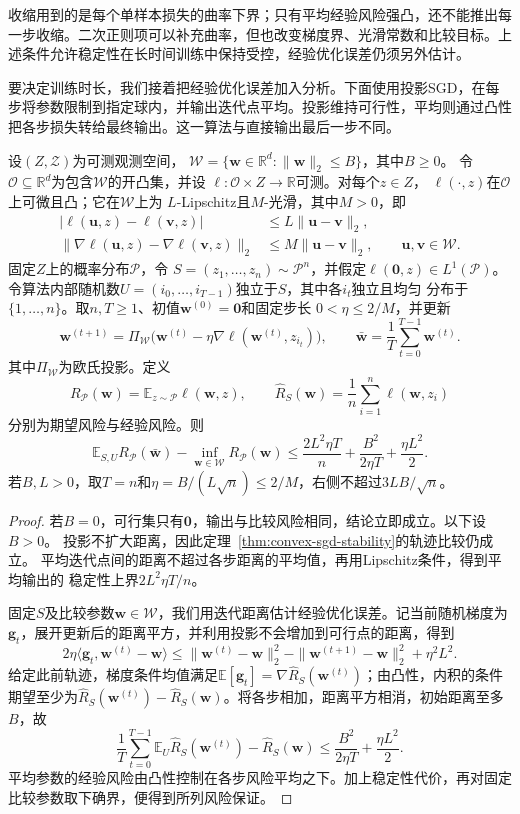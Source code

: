 收缩用到的是每个单样本损失的曲率下界；只有平均经验风险强凸，还不能推出每一步收缩。二次正则项可以补充曲率，但也改变梯度界、光滑常数和比较目标。上述条件允许稳定性在长时间训练中保持受控，经验优化误差仍须另外估计。

要决定训练时长，我们接着把经验优化误差加入分析。下面使用投影SGD，在每步将参数限制到指定球内，并输出迭代点平均。投影维持可行性，平均则通过凸性把各步损失转给最终输出。这一算法与直接输出最后一步不同。

\begin{theorem}[平均投影SGD的期望风险保证]
\label{thm:averaged-sgd-learning}
设$(Z,\mathcal Z)$为可测观测空间，
$\mathcal W=\{\bm w\in\mathbb R^d:\|\bm w\|_2\leq B\}$，其中$B\geq0$。
令$\mathcal O\subseteq\mathbb R^d$为包含$\mathcal W$的开凸集，并设
$\ell:\mathcal O\times Z\to\mathbb R$可测。对每个$z\in Z$，
$\ell(\cdot,z)$在$\mathcal O$上可微且凸；它在$\mathcal W$上为
$L$-Lipschitz且$M$-光滑，其中$M>0$，即
\[
\begin{aligned}
 |\ell(\bm u,z)-\ell(\bm v,z)|
 &\leq L\|\bm u-\bm v\|_2,\\
 \|\nabla\ell(\bm u,z)-\nabla\ell(\bm v,z)\|_2
 &\leq M\|\bm u-\bm v\|_2,
 \qquad \bm u,\bm v\in\mathcal W.
\end{aligned}
\]
固定$Z$上的概率分布$\mathcal P$，令
$S=(z_1,\ldots,z_n)\sim\mathcal P^n$，并假定$\ell(\bm 0,z)\in L^1(\mathcal P)$。
令算法内部随机数$U=(i_0,\ldots,i_{T-1})$独立于$S$，其中各$i_t$独立且均匀
分布于$\{1,\ldots,n\}$。取$n,T\geq1$、初值$\bm w^{(0)}=\bm 0$和固定步长
$0<\eta\leq2/M$，并更新
\[
 \bm w^{(t+1)}=\Pi_{\mathcal W}
   \bigl(\bm w^{(t)}-\eta\nabla\ell(\bm w^{(t)},z_{i_t})\bigr),
 \qquad
 \bar{\bm w}=\frac1T\sum_{t=0}^{T-1}\bm w^{(t)}.
\]
其中$\Pi_{\mathcal W}$为欧氏投影。定义
\[
 R_{\mathcal P}(\bm w)=\mathbb E_{z\sim\mathcal P}\ell(\bm w,z),
 \qquad
 \hat R_S(\bm w)=\frac1n\sum_{i=1}^n\ell(\bm w,z_i)
\]
分别为期望风险与经验风险。则
\[
 \mathbb E_{S,U}R_{\mathcal P}(\bar{\bm w})-\inf_{\bm w\in\mathcal W}R_{\mathcal P}(\bm w)
 \leq\frac{2L^2\eta T}{n}+\frac{B^2}{2\eta T}+\frac{\eta L^2}{2}.
\]
若$B,L>0$，取$T=n$和$\eta=B/(L\sqrt n)\leq2/M$，右侧不超过$3LB/\sqrt n$。
\end{theorem}
\begin{proof}
若$B=0$，可行集只有$\bm0$，输出与比较风险相同，结论立即成立。以下设$B>0$。
投影不扩大距离，因此定理~\ref{thm:convex-sgd-stability}的轨迹比较仍成立。
平均迭代点间的距离不超过各步距离的平均值，再用Lipschitz条件，得到平均输出的
稳定性上界$2L^2\eta T/n$。

固定$S$及比较参数$\bm w\in\mathcal W$，我们用迭代距离估计经验优化误差。记当前随机梯度为$\bm g_t$，展开更新后的距离平方，并利用投影不会增加到可行点的距离，得到
\[
 2\eta\langle\bm g_t,\bm w^{(t)}-\bm w\rangle
 \leq\|\bm w^{(t)}-\bm w\|_2^2
 -\|\bm w^{(t+1)}-\bm w\|_2^2+\eta^2L^2.
\]
给定此前轨迹，梯度条件均值满足$\mathbb E[\bm g_t]=\nabla\hat R_S(\bm w^{(t)})$；由凸性，内积的条件期望至少为$\hat R_S(\bm w^{(t)})-\hat R_S(\bm w)$。将各步相加，距离平方相消，初始距离至多$B$，故
\[
 \frac1T\sum_{t=0}^{T-1}\mathbb E_U\hat R_S(\bm w^{(t)})-\hat R_S(\bm w)
 \leq\frac{B^2}{2\eta T}+\frac{\eta L^2}{2}.
\]
平均参数的经验风险由凸性控制在各步风险平均之下。加上稳定性代价，再对固定比较参数取下确界，便得到所列风险保证。
\end{proof}

